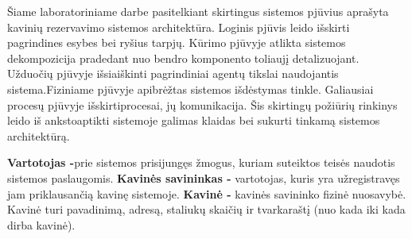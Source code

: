 \documentclass{VUMIFPSkursinis}
\begin{document}
Šiame laboratoriniame darbe pasitelkiant skirtingus sistemos pjūvius aprašyta kavinių rezervavimo sistemos architektūra. Loginis pjūvis leido išskirti pagrindines esybes bei ryšius tarpjų. Kūrimo pjūvyje atlikta sistemos dekompozicija pradedant nuo bendro komponento toliaujį detalizuojant. Užduočių pjūvyje išsiaiškinti pagrindiniai agentų tikslai naudojantis sistema.Fiziniame pjūvyje apibrėžtas sistemos išdėstymas tinkle.  Galiausiai procesų pjūvyje išskirtiprocesai, jų komunikacija. Šis skirtingų požiūrių rinkinys leido iš ankstoaptikti sistemoje galimas klaidas bei sukurti tinkamą sistemos architektūrą.

\noindent
\textbf{Vartotojas -}prie sistemos prisijungęs žmogus, kuriam suteiktos teisės naudotis sistemos
paslaugomis.
\newline
\textbf{Kavinės savininkas -} vartotojas, kuris yra užregistravęs jam priklausančią kavinę sistemoje.
\newline
\textbf{Kavinė -} kavinės savininko fizinė nuosavybė. Kavinė turi pavadinimą, adresą, staliukų skaičių ir tvarkaraštį (nuo kada iki kada dirba kavinė).
\newline
\end{document}
